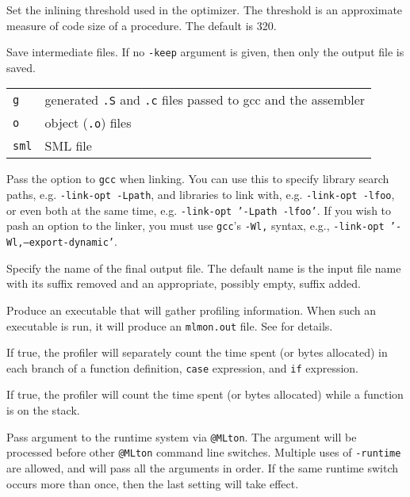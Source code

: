 \begin{description}
Set the inlining threshold used in the optimizer.  The threshold is an
approximate measure of code size of a procedure.  The default is 320.

Save intermediate files.  If no {\tt -keep} argument is given, then
only the output file is saved.\\
\hspace*{0.5in}
\begin{tabular}{l|l}
\hline
{\tt g} & generated {\tt .S} and {\tt .c} files passed to gcc and the assembler\\
{\tt o} & object ({\tt .o}) files\\
{\tt sml} & SML file\\
\end{tabular}

Pass the option to {\tt gcc} when linking.  You can use this to
specify library search paths, e.g. {\tt -link-opt -Lpath}, and
libraries to link with, e.g. {\tt -link-opt -lfoo}, or even both at
the same time, e.g. {\tt -link-opt '-Lpath -lfoo'}.  If you wish to
pash an option to the linker, you must use {\tt gcc}'s {\tt -Wl,}
syntax, e.g., {\tt -link-opt '-Wl,--export-dynamic'}.

Specify the name of the final output file. The default name is the
input file name with its suffix removed and an appropriate, possibly
empty, suffix added.

Produce an executable that will gather profiling information.  When
such an executable is run, it will produce an {\tt mlmon.out} file.
See  for details.

If true, the profiler will separately count the time spent (or bytes
allocated) in each branch of a function definition, {\tt case}
expression, and {\tt if} expression.

If true, the profiler will count the time spent (or bytes allocated)
while a function is on the stack.

Pass argument to the runtime system via {\tt @MLton}.  The argument
will be processed before other {\tt @MLton} command line switches.
Multiple uses of {\tt -runtime} are allowed, and will pass all the
arguments in order.  If the same runtime switch occurs more than once,
then the last setting will take effect.


\end{description}
